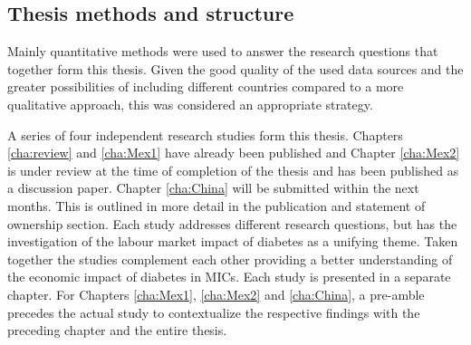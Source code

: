 \subsection{Thesis methods and structure}

Mainly quantitative methods were used to answer the research questions that together form this thesis. Given the good quality of the used data sources and the greater possibilities of including different countries compared to a more qualitative approach, this was considered an appropriate strategy.

A series of four independent research studies form this thesis. Chapters \ref{cha:review} and \ref{cha:Mex1} have already been published and Chapter \ref{cha:Mex2} is under review at the time of completion of the thesis and has been published as a discussion paper. Chapter \ref{cha:China} will be submitted within the next months. This is outlined in more detail in the publication and statement of ownership section. Each study addresses different research questions, but has the investigation of the labour market impact of diabetes as a unifying theme. Taken together the studies complement each other providing a better understanding of the economic impact of diabetes in \acp{MIC}. Each study is presented in a separate chapter. For Chapters \ref{cha:Mex1}, \ref{cha:Mex2} and \ref{cha:China}, a pre-amble precedes the actual study to contextualize the respective findings with the preceding chapter and the entire thesis.


